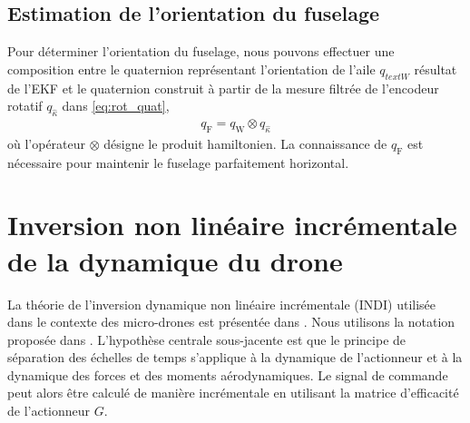 \subsection{Estimation de l'orientation du fuselage}
Pour déterminer l'orientation du fuselage, nous pouvons effectuer une composition entre le quaternion représentant l'orientation de l'aile $q_{text{W}}$ résultat de l'EKF et le quaternion construit à partir de la mesure filtrée de l'encodeur rotatif $q_{\hat{\kappa}}$ dans \eqref{eq:rot_quat},
\begin{align}
\label{eq:quat_fuselage}
    q_{\text{F}} = q_{\text{W}} \otimes q_{\hat{\kappa}}
\end{align}
où l'opérateur $\otimes$ désigne le produit hamiltonien. La connaissance de $q_{\text{F}}$ est nécessaire pour maintenir le fuselage parfaitement horizontal. 

\section{Inversion non linéaire incrémentale de la dynamique du drone}

La théorie de l'inversion dynamique non linéaire incrémentale (INDI) utilisée dans le contexte des micro-drones est présentée dans \cite{smeurINDI}. Nous utilisons la notation proposée dans \cite{smeurINDITail}. L'hypothèse centrale sous-jacente est que le principe de séparation des échelles de temps s'applique à la dynamique de l'actionneur et à la dynamique des forces et des moments aérodynamiques. Le signal de commande peut alors être calculé de manière incrémentale en utilisant la matrice d'efficacité de l'actionneur $G$.

